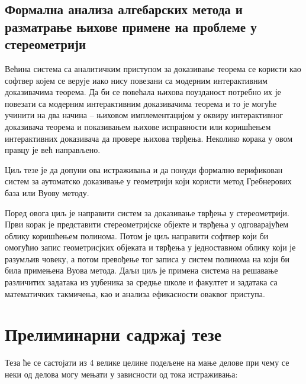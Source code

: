 \documentclass[11pt]{article}
\begin{document}
\subsection{Формална анализа алгебарских метода и разматрање њихове
  примене на проблеме у стереометрији}

Већина система са аналитичким приступом за доказивање теорема се
користи као софтвер којем се верује иако нису повезани са модерним
интерактивним доказивачима теорема. Да би се повећала њихова
поузданост потребно их је повезати са модерним интерактивним
до\-ка\-зи\-ва\-чи\-ма теорема и то је могуће учинити на два начина --
њиховом имплементацијом у оквиру интерактивног доказивача теорема и
показивањем њихове исправности или коришћењем ин\-тер\-ак\-тив\-них
доказивача да провере њихова тврђења. Неколико корака у овом правцу је
већ направљено.

Циљ тезе је да допуни ова истраживања и да понуди формално верификован
систем за аутоматско доказивање у геометрији који користи метод
Гребнерових база или Вуову методу.

Поред овога циљ је направити систем за доказивање тврђења у
стереометрији. Први корак је представити стереометријске објекте и
тврђења у одговарајућем облику коришћењем полинома. Потом је циљ
направити софтвер који би омогућио запис геометрисјких објеката и
тврђења у једноставном облику који је разумљив човеку, а потом
превођење тог записа у систем полинома на који би била примењена Вуова
метода. Даљи циљ је примена система на решавање различитих задатака из
уџбеника за средње школе и факултет и задатака са математичких
такмичења, као и анализа ефикасности оваквог приступа.

\section{Прелиминарни садржај тезе}

Теза ће се састојати из 4 велике целине подељене на мање делове при
чему се неки од делова могу мењати у зависности од тока истраживања:
\end{document}
